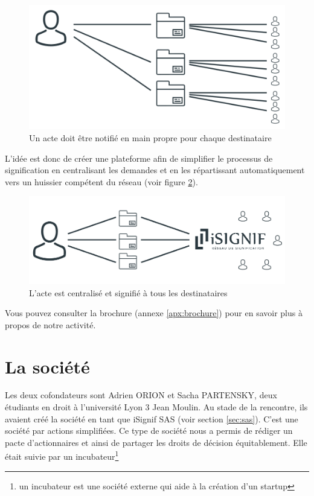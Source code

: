 \documentclass[]{report}
\begin{document}
    \begin{figure}
      \includegraphics[width=\linewidth]{img/signification_before.png}
      \caption{Un acte doit être notifié en main propre pour chaque destinataire}
      \label{fig:signification_before}
    \end{figure}

    L'idée est donc de créer une plateforme afin de simplifier le processus de signification en centralisant les demandes et en les répartissant automatiquement vers un huissier compétent du réseau  (voir figure \ref{fig:signification_after}).

    \begin{figure}
      \includegraphics[width=\linewidth]{img/signification_after.png}
      \caption{L'acte est centralisé et signifié à tous les destinataires}
      \label{fig:signification_after}
    \end{figure}

    Vous pouvez consulter la brochure (annexe \ref{apx:brochure}) pour en savoir plus à propos de notre activité.






  \section{La société}

    Les deux cofondateurs sont Adrien ORION et Sacha PARTENSKY, deux étudiants en droit à l’université Lyon 3 Jean Moulin. Au stade de la rencontre, ils avaient créé la société en tant que iSignif SAS (voir section \ref{sec:sas}). C'est une société par actions simplifiées. Ce type de société nous a permis de rédiger un pacte d'actionnaires et ainsi de partager les droits de décision équitablement. Elle était suivie par un incubateur\footnote{un incubateur est une société externe qui aide à la création d'un startup}
\end{document}
